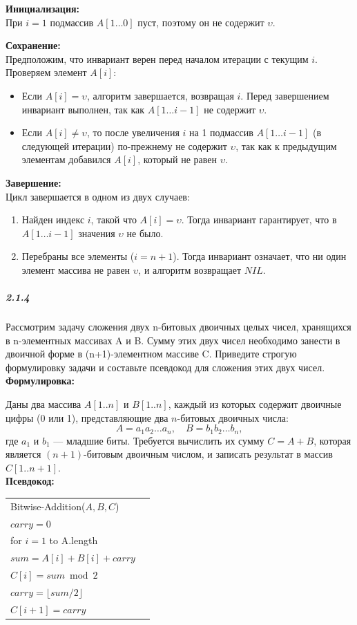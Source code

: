 \textbf{Инициализация:} \\
При $i = 1$ подмассив $A[1 \ldots 0]$ пуст, поэтому он не содержит $\upsilon$.

\textbf{Сохранение:} \\
Предположим, что инвариант верен перед началом итерации с текущим $i$. Проверяем элемент $A[i]$:
\begin{itemize}
    \item Если $A[i] = \upsilon$, алгоритм завершается, возвращая $i$. Перед завершением инвариант выполнен, так как $A[1 \ldots i-1]$ не содержит $\upsilon$.
    \item Если $A[i] \neq \upsilon$, то после увеличения $i$ на 1 подмассив $A[1 \ldots i-1]$ (в следующей итерации) по-прежнему не содержит $\upsilon$, так как к предыдущим элементам добавился $A[i]$, который не равен $\upsilon$.
\end{itemize}

\textbf{Завершение:} \\
Цикл завершается в одном из двух случаев:
\begin{enumerate}
    \item Найден индекс $i$, такой что $A[i] = \upsilon$. Тогда инвариант гарантирует, что в $A[1 \ldots i-1]$ значения $\upsilon$ не было.
    \item Перебраны все элементы ($i = n+1$). Тогда инвариант означает, что ни один элемент массива не равен $\upsilon$, и алгоритм возвращает $NIL$.
\end{enumerate}

\subparagraph{2.1.4}
Рассмотрим задачу сложения двух n-битовых двоичных целых чисел, хранящихся в n-элементных массивах A и B. Сумму этих двух чисел необходимо занести в двоичной форме в (n+1)-элементном массиве C. Приведите строгую формулировку задачи и составьте псевдокод для сложения этих двух чисел. \\

\textbf{Формулировка:}

Даны два массива $A[1..n]$ и $B[1..n]$, каждый из которых содержит двоичные цифры (0 или 1), представляющие два $n$-битовых двоичных числа:
\[
A = a_1 a_2 \ldots a_n, \quad B = b_1 b_2 \ldots b_n,
\]
где $a_1$ и $b_1$ — младшие биты. Требуется вычислить их сумму $C = A + B$, которая является $(n+1)$-битовым двоичным числом, и записать результат в массив $C[1..n+1]$. \\

\textbf{Псевдокод:} \\
\begin{tabular}{ll}
Bitwise-Addition($A, B, C$) & \\
\quad $carry = 0$ & \\
\quad for $i = 1$ to A.length & \\
\quad \quad $sum = A[i] + B[i] + carry$ & \\
\quad \quad $C[i] = sum\bmod{2}$ & \\
\quad \quad $carry = \lfloor sum/2 \rfloor$ & \\
\quad $C[i+1] = carry$ & \\
\end{tabular} \\